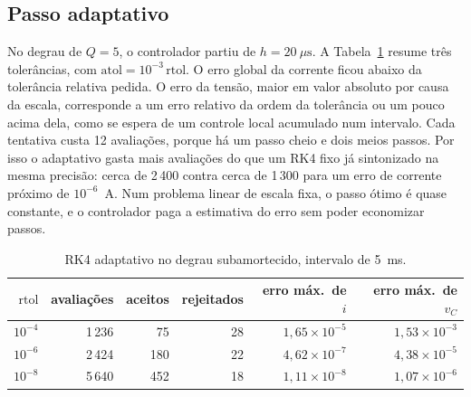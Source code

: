 \subsection{Passo adaptativo}

No degrau de \(Q=5\), o controlador partiu de \(h=20~\mu\mathrm{s}\). A Tabela~\ref{tab:adap} resume três tolerâncias, com \(\mathrm{atol}=10^{-3}\,\mathrm{rtol}\). O erro global da corrente ficou abaixo da tolerância relativa pedida. O erro da tensão, maior em valor absoluto por causa da escala, corresponde a um erro relativo da ordem da tolerância ou um pouco acima dela, como se espera de um controle local acumulado num intervalo. Cada tentativa custa 12 avaliações, porque há um passo cheio e dois meios passos. Por isso o adaptativo gasta mais avaliações do que um RK4 fixo já sintonizado na mesma precisão: cerca de 2\,400 contra cerca de 1\,300 para um erro de corrente próximo de \(10^{-6}\)~A. Num problema linear de escala fixa, o passo ótimo é quase constante, e o controlador paga a estimativa do erro sem poder economizar passos.

\begin{table}[htbp]
\centering
\caption{RK4 adaptativo no degrau subamortecido, intervalo de 5~ms.}
\label{tab:adap}
\small
\setlength{\tabcolsep}{4pt}
\begin{tabular}{@{}rrrrrr@{}}
\toprule
\(\mathrm{rtol}\) & avaliações & aceitos & rejeitados & erro máx.\ de \(i\) & erro máx.\ de \(v_C\) \\
\midrule
\(10^{-4}\) & 1\,236 & 75 & 28 & \(1{,}65\times 10^{-5}\) & \(1{,}53\times 10^{-3}\) \\
\(10^{-6}\) & 2\,424 & 180 & 22 & \(4{,}62\times 10^{-7}\) & \(4{,}38\times 10^{-5}\) \\
\(10^{-8}\) & 5\,640 & 452 & 18 & \(1{,}11\times 10^{-8}\) & \(1{,}07\times 10^{-6}\) \\
\bottomrule
\end{tabular}
\end{table}

